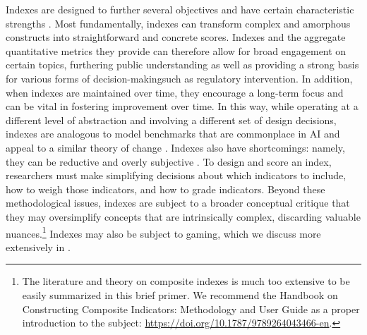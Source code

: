 Indexes are designed to further several objectives and have certain characteristic strengths \citep{joint2008handbook, saisana2002state}. 
Most fundamentally, indexes can transform complex and amorphous constructs into straightforward and concrete scores.
Indexes and the aggregate quantitative metrics they provide can therefore allow for broad engagement on certain topics, furthering public understanding as well as providing a strong basis for various forms of decision-makingsuch as regulatory intervention. 
In addition, when indexes are maintained over time, they encourage a long-term focus and can be vital in fostering improvement over time.
In this way, while operating at a different level of abstraction and involving a different set of design decisions, indexes are analogous to model benchmarks that are commonplace in AI \citep{deng2009imagenet, wang2019superglue, liang2023holistic} and appeal to a similar theory of change \citep{donoho2017fifty, ethayarajh2020utility, raji2021benchmark, bommasani2022evaluation}.
Indexes also have shortcomings: namely, they can be reductive and overly subjective \citep{saisana2002state, oecd2008handbook, greco2019methodological}.
To design and score an index, researchers must make simplifying decisions about which indicators to include, how to weigh those indicators, and how to grade indicators.
Beyond these methodological issues, indexes are subject to a broader conceptual critique that they may oversimplify concepts that are intrinsically complex, discarding valuable nuances.\footnote{The literature and theory on composite indexes is much too extensive to be easily summarized in this brief primer.
We recommend the Handbook on Constructing Composite Indicators: Methodology and User Guide \citep{oecd2008handbook} as a proper introduction to the subject: \url{https://doi.org/10.1787/9789264043466-en}.} 
Indexes may also be subject to gaming, which we discuss more extensively in .
\clearpage

